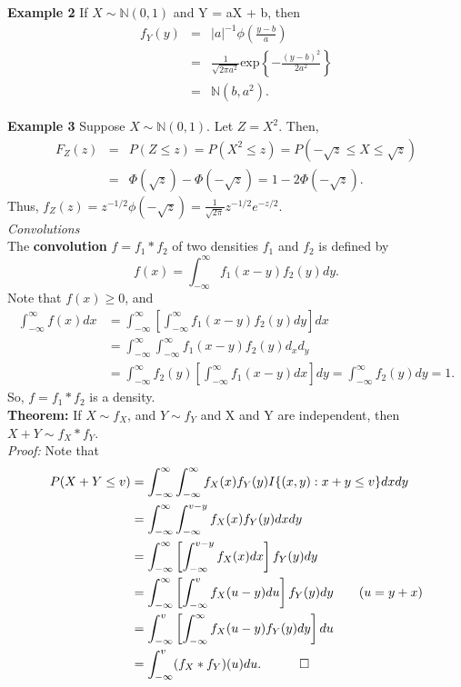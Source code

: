 \documentclass[12pt,oneside]{article}
\begin{document}
\noindent \textbf {Example 2} If $X \sim \mathbb{N}(0,1)$ and Y = aX + b, then
\begin{eqnarray*} f_Y(y) &=& |a|^{-1} \phi (\frac{y-b}{a}) \\ &=& \frac{1}{\sqrt{2 \pi a^2}} \mbox{exp} \left\{ -\frac{(y-b)^2}{2a^2} \right\} \\ &=&   \mathbb{N}(b,a^2). \end{eqnarray*}

\noindent \textbf{Example 3} Suppose $X \sim \mathbb{N}(0,1)$.  Let $Z = X^2$.  Then,
\begin{eqnarray*}  F_Z (z) &=& P(Z \leq z) = P(X^2 \leq z) = P(-\sqrt{z} \leq X \leq \sqrt{z}) \\ &=& \Phi(\sqrt{z}) - \Phi(-\sqrt{z}) = 1-2\Phi(-\sqrt{z}). \end{eqnarray*}
Thus, $f_Z(z) = z^{-1/2} \phi (-\sqrt{z}) = \frac{1}{\sqrt{2 \pi}} z^{-1/2} e^{-z/2}$. \\

\noindent \emph{Convolutions}\\

The \textbf{convolution} $f=f_1 \ast f_2$ of two densities $f_1$ and $f_2$ is defined by \[f(x) = \int_{-\infty}^{\infty} f_1(x-y)f_2(y)dy.\]
Note that $f(x) \geq 0$, and
\begin{align*}
\int_{-\infty}^{\infty} f(x) dx &= \int_{-\infty}^{\infty} \left[\int_{-\infty}^{\infty}  f_1(x-y)f_2(y)dy\right]dx \\
&=  \int_{-\infty}^{\infty} \int_{-\infty}^{\infty} f_1(x-y)f_2(y)d_xd_y\\
&= \int_{-\infty}^{\infty} f_2(y) \left[\int_{-\infty}^{\infty} f_1 (x-y)dx \right] dy = \int_{-\infty}^{\infty}f_2(y)dy = 1.
\end{align*}
So, $f = f_1 \ast f_2$ is a density. \\

\noindent \textbf{Theorem:}  If $X \sim f_X$, and $Y \sim f_Y$ and X and Y are independent, then $X+Y \sim f_X \ast f_Y$.\\

\noindent \emph{Proof:} Note that
\begin{align*}
P(X+Y \leq v) &= \int_{-\infty}^\infty  \int_{-\infty}^\infty  f_X(x) f_Y(y)  I\{ (x,y):x+y \leq v \} dx dy \\
&= \int_{-\infty}^\infty \int_{-\infty}^{v-y} f_X(x)f_Y(y)dxdy  \\
&=  \int_{-\infty}^\infty\left[ \int_{-\infty}^{v-y} f_X(x) dx\right] f_Y(y) dy \\
&= \int_{-\infty}^\infty \left[ \int_{-\infty}^{v} f_X (u-y) du\right] f_Y(y) dy \hspace{20 pt} (u = y+x) \\
&= \int_{-\infty}^v \left[\int_{-\infty}^{\infty} f_X(u-y)f_Y(y)dy\right]du \\
&= \int_{-\infty}^v (f_X \ast f_Y)(u) du . \hspace{30 pt}\Box
\end{align*}
\end{document}
